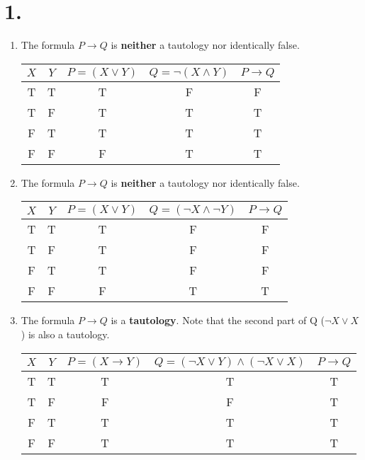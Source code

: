 \documentclass[12pt]{article}
\newcommand{\p}[1]{\item[\textnormal{(#1)}]}
\newenvironment{ps}
{\begin{enumerate}[leftmargin=0em, itemindent=1.5em]}
{\end{enumerate}}
\begin{document}
\section*{1.}
\begin{ps}

    \p{i} The formula \(P \rightarrow Q\) is \textbf{neither} a tautology nor identically
    false.
        \begin{center}
        \begin{tabular}{|c|c|c|c|c|}
        \hline
        $X$ & $Y$ & $P = (X \vee Y)$ & $Q = \neg (X \wedge Y)$ & $P \rightarrow Q$ \\
        \hline
        T & T & T & F & F \\
        T & F & T & T & T \\
        F & T & T & T & T \\
        F & F & F & T & T \\
        \hline
        \end{tabular}
        \end{center}

    \p{ii} The formula \(P \rightarrow Q\) is \textbf{neither} a tautology nor identically
    false.

        \begin{center}
        \begin{tabular}{|c|c|c|c|c|}
        \hline
        $X$ & $Y$ & $P = (X \vee Y)$ & $Q = (\neg X \wedge \neg Y)$ & $P \rightarrow Q$ \\
        \hline
        T & T & T & F & F \\
        T & F & T & F & F \\
        F & T & T & F & F \\
        F & F & F & T & T \\
        \hline
        \end{tabular}
        \end{center}

    \p{iii} The formula \(P \rightarrow Q\) is a \textbf{tautology}. Note that the second
    part of Q (\(\neg X \vee X\)) is also a tautology.

        \begin{center}
        \begin{tabular}{|c|c|c|c|c|}
        \hline
        $X$ & $Y$ & $P = (X \rightarrow Y)$ & $Q = (\neg X \vee Y) \wedge (\neg X \vee X)$ & $P \rightarrow Q$ \\
        \hline
        T & T & T & T & T \\
        T & F & F & F & T \\
        F & T & T & T & T \\
        F & F & T & T & T \\
        \hline
        \end{tabular}
        \end{center}


\end{ps}
\end{document}
